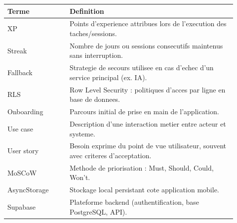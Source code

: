 \documentclass[12pt,a4paper]{article}
\begin{document}
\begin{longtable}{p{0.25\linewidth}p{0.67\linewidth}}
\toprule
\textbf{Terme} & \textbf{Definition} \\
\midrule
XP & Points d'experience attribues lors de l'execution des taches/sessions. \\
Streak & Nombre de jours ou sessions consecutifs maintenus sans interruption. \\
Fallback & Strategie de secours utilisee en cas d'echec d'un service principal (ex. IA). \\
RLS & Row Level Security : politiques d'acces par ligne en base de donnees. \\
Onboarding & Parcours initial de prise en main de l'application. \\
Use case & Description d'une interaction metier entre acteur et systeme. \\
User story & Besoin exprime du point de vue utilisateur, souvent avec criteres d'acceptation. \\
MoSCoW & Methode de priorisation : Must, Should, Could, Won't. \\
AsyncStorage & Stockage local persistant cote application mobile. \\
Supabase & Plateforme backend (authentification, base PostgreSQL, API). \\
\bottomrule
\end{longtable}
\end{document}
